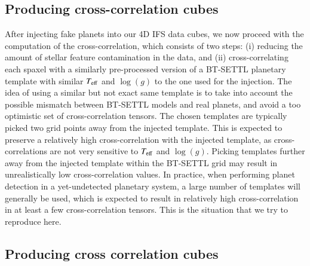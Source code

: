 \documentclass[referee]{aa} %
\newcommand{\newchange}[1]{\textcolor{darkgreen}{#1}}
\begin{document}
\subsection{Producing cross-correlation cubes}\label{sec:specpreproc}

After injecting fake planets into our 4D IFS data cubes, we now proceed with the computation of the cross-correlation, which consists of two steps: (i) reducing the amount of stellar feature contamination in the data, and (ii) cross-correlating each spaxel with a similarly pre-processed version of a BT-SETTL planetary template with similar $T_{\rm eff}$ and $\log(g)$ to the one used for the injection.
The idea of using a similar but not exact same template is to take into account the possible mismatch between BT-SETTL models and real planets, and avoid a too optimistic set of cross-correlation tensors. The chosen templates are typically picked two grid points away from the injected template. This is expected to preserve a relatively high cross-correlation with the injected template, as cross-correlations are not very sensitive to $T_{\rm eff}$ and $\log(g)$. Picking templates further away from the injected template within the BT-SETTL grid may result in unrealistically low cross-correlation values. In practice, when performing planet detection in a yet-undetected planetary system, a large number of templates will generally be used, which is expected to result in relatively high cross-correlation in at least a few cross-correlation tensors. This is the situation that we try to reproduce here.

\subsection{Producing cross correlation cubes}\label{sec:cubeproc}
\end{document}
